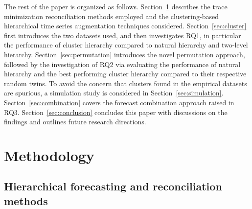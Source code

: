 \documentclass[a4paper,review,12pt,authoryear]{elsarticle}
\begin{document}
The rest of the paper is organized as follows. Section~\ref{sec:methodology} describes the trace minimization reconciliation methods employed and the clustering-based hierarchical time series augmentation techniques considered. Section~\ref{sec:cluster} first introduces the two datasets used, and then investigates RQ1, in particular the performance of cluster hierarchy compared to natural hierarchy and two-level hierarchy. Section~\ref{sec:permutation} introduces the novel permutation approach, followed by the investigation of RQ2 via evaluating the performance of natural hierarchy and the best performing cluster hierarchy compared to their respective random twins. To avoid the concern that clusters found in the empirical datasets are spurious, a simulation study is considered in Section~\ref{sec:simulation}. Section~\ref{sec:combination} covers the forecast combination approach raised in RQ3. Section~\ref{sec:conclusion} concludes this paper with discussions on the findings and outlines future research directions. 



\section{Methodology}\label{sec:methodology}

\subsection{Hierarchical forecasting and reconciliation methods}

\end{document}
